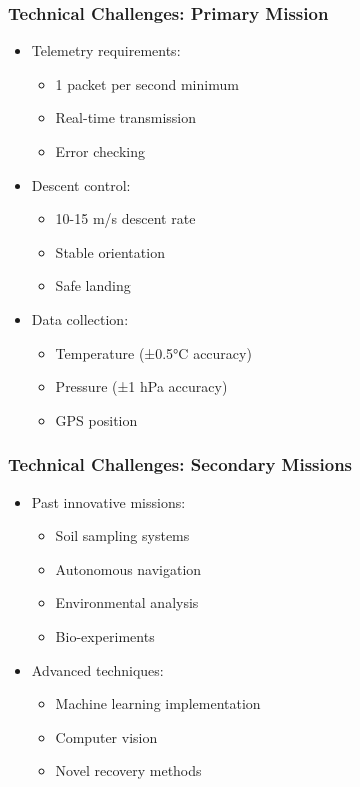 \documentclass{beamer}
\begin{document}
\begin{frame}
\frametitle{Technical Challenges: Primary Mission}
\begin{itemize}
\item Telemetry requirements:
    \begin{itemize}
    \item 1 packet per second minimum
    \item Real-time transmission
    \item Error checking
    \end{itemize}
\item Descent control:
    \begin{itemize}
    \item 10-15 m/s descent rate
    \item Stable orientation
    \item Safe landing
    \end{itemize}
\item Data collection:
    \begin{itemize}
    \item Temperature (±0.5°C accuracy)
    \item Pressure (±1 hPa accuracy)
    \item GPS position
    \end{itemize}
\end{itemize}
\end{frame}

\begin{frame}
\frametitle{Technical Challenges: Secondary Missions}
\begin{itemize}
\item Past innovative missions:
    \begin{itemize}
    \item Soil sampling systems
    \item Autonomous navigation
    \item Environmental analysis
    \item Bio-experiments
    \end{itemize}
\item Advanced techniques:
    \begin{itemize}
    \item Machine learning implementation
    \item Computer vision
    \item Novel recovery methods
    \end{itemize}
\end{itemize}
\end{frame}
\end{document}
